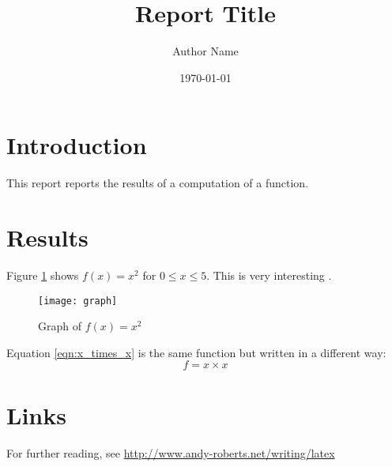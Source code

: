 \documentclass[a4paper,10pt]{article}
\title{Report Title}
\author{Author Name}
\date{\today}
\begin{document}
\maketitle

\section*{Introduction}
This report reports the results of a computation of a function.

\section*{Results}
Figure \ref{fig:graph} shows $f(x) =  x^2$ for $0 \leq x \leq 5$. This is very interesting \citep{greenwade93}.
\begin{figure}[htp]
  \centering
  \texttt{[image: graph]}
  \caption{Graph of $f(x) = x^2$}
  \label{fig:graph}
\end{figure}
Equation \ref{eqn:x_times_x} is the same function but written in a different way:
\begin{equation} \label{eqn:x_times_x}
f = x \times x
\end{equation}

\section*{Links}
For further reading, see \url{http://www.andy-roberts.net/writing/latex}


\end{document}
